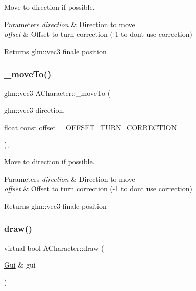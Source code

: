 Move to direction if possible. 


\begin{DoxyParams}{Parameters}
{\em direction} & Direction to move \\
\hline
{\em offset} & Offset to turn correction (-\/1 to don\textquotesingle{}t use correction) \\
\hline
\end{DoxyParams}
\begin{DoxyReturn}{Returns}
glm\+::vec3 finale position 
\end{DoxyReturn}
\mbox{\label{class_a_character_a1a85eefb6e443e0e8a49ffb8e683659d}} 
\subsubsection{\texorpdfstring{\+\_\+move\+To()}{\_moveTo()}\hspace{0.1cm}{\footnotesize\ttfamily [2/2]}}
{\footnotesize\ttfamily glm\+::vec3 A\+Character\+::\+\_\+move\+To (\begin{DoxyParamCaption}\item[{glm\+::vec3}]{direction,  }\item[{float const}]{offset = {\ttfamily OFFSET\+\_\+TURN\+\_\+CORRECTION} }\end{DoxyParamCaption})\hspace{0.3cm}{\ttfamily [protected]}, {\ttfamily [virtual]}}



Move to direction if possible. 


\begin{DoxyParams}{Parameters}
{\em direction} & Direction to move \\
\hline
{\em offset} & Offset to turn correction (-\/1 to don\textquotesingle{}t use correction) \\
\hline
\end{DoxyParams}
\begin{DoxyReturn}{Returns}
glm\+::vec3 finale position 
\end{DoxyReturn}
\mbox{\label{class_a_character_af223d3c9dbd3143daf62e9834bd30e3d}} 
\subsubsection{\texorpdfstring{draw()}{draw()}}
{\footnotesize\ttfamily virtual bool A\+Character\+::draw (\begin{DoxyParamCaption}\item[{\hyperlink{class_gui}{Gui} \&}]{gui }\end{DoxyParamCaption})\hspace{0.3cm}{\ttfamily [pure virtual]}}



